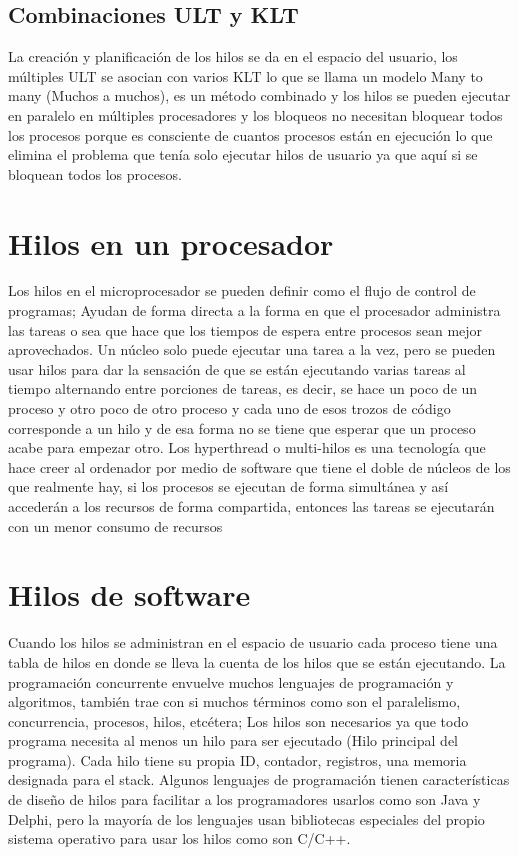 \documentclass[11pt]{article}
\begin{document}
\subsection{Combinaciones ULT y KLT}
La creación y planificación de los hilos se da en el espacio del usuario, los múltiples ULT se asocian con varios KLT lo que se llama un modelo Many to many (Muchos a muchos), es un método combinado y los hilos se pueden ejecutar en paralelo en múltiples procesadores y los bloqueos no necesitan bloquear todos los procesos porque es consciente de cuantos procesos están en ejecución lo que elimina el problema que tenía solo ejecutar hilos de usuario ya que aquí si se bloquean todos los procesos.
\cite{usuario_kernel}

\section{Hilos en un procesador}
Los hilos en el microprocesador se pueden definir como el flujo de control de programas; Ayudan de forma directa a la forma en que el procesador administra las tareas o sea que hace que los tiempos de espera entre procesos sean mejor aprovechados. Un núcleo solo puede ejecutar una tarea a la vez, pero se pueden usar hilos para dar la sensación de que se están ejecutando varias tareas al tiempo alternando entre porciones de tareas, es decir, se hace un poco de un proceso y otro poco de otro proceso y cada uno de esos trozos de código corresponde a un hilo y de esa forma no se tiene que esperar que un proceso acabe para empezar otro. Los hyperthread o multi-hilos es una tecnología que hace creer al ordenador por medio de software que tiene el doble de núcleos de los que realmente hay, si los procesos se ejecutan de forma simultánea y así accederán a los recursos de forma compartida, entonces las tareas se ejecutarán con un menor consumo de recursos
\cite{hardware}

\section{Hilos de software}
Cuando los hilos se administran en el espacio de usuario cada proceso tiene una tabla de hilos en donde se lleva la cuenta de los hilos que se están ejecutando. La programación concurrente envuelve muchos lenguajes de programación y algoritmos, también trae con si muchos términos como son el paralelismo, concurrencia, procesos, hilos, etcétera; Los hilos son necesarios ya que todo programa necesita al menos un hilo para ser ejecutado (Hilo principal del programa). Cada hilo tiene su propia ID, contador, registros, una memoria designada para el stack. Algunos lenguajes de programación tienen características de diseño de hilos para facilitar a los programadores usarlos como son Java y Delphi, pero la mayoría de los lenguajes usan bibliotecas especiales del propio sistema operativo para usar los hilos como son C/C++.
\cite{software}
\end{document}
